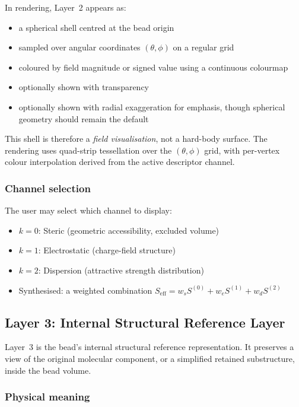 \documentclass[11pt]{article}
\begin{document}
In rendering, Layer~2 appears as:
\begin{itemize}
    \item a spherical shell centred at the bead origin
    \item sampled over angular coordinates $(\theta, \phi)$ on a regular grid
    \item coloured by field magnitude or signed value using a continuous
          colourmap
    \item optionally shown with transparency
    \item optionally shown with radial exaggeration for emphasis, though
          spherical geometry should remain the default
\end{itemize}

This shell is therefore a \emph{field visualisation}, not a hard-body
surface.  The rendering uses quad-strip tessellation over the
$(\theta, \phi)$ grid, with per-vertex colour interpolation derived from
the active descriptor channel.

\subsubsection{Channel selection}

The user may select which channel to display:
\begin{itemize}
    \item $k = 0$: Steric (geometric accessibility, excluded volume)
    \item $k = 1$: Electrostatic (charge-field structure)
    \item $k = 2$: Dispersion (attractive strength distribution)
    \item Synthesised: a weighted combination
          $S_{\mathrm{eff}} = w_s S^{(0)} + w_e S^{(1)} + w_d S^{(2)}$
\end{itemize}

\subsection{Layer 3: Internal Structural Reference Layer}

Layer~3 is the bead's internal structural reference representation.  It
preserves a view of the original molecular component, or a simplified
retained substructure, inside the bead volume.

\subsubsection{Physical meaning}
\end{document}
